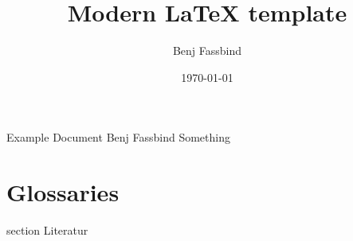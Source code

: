 \documentclass[oneside]{modern}
\title{Modern LaTeX template}
\author{Benj Fassbind}
\date{\today}
\begin{document}
  \nocite{*}

  \firstpage
    {Example Document}
    {Benj Fassbind}
    {Something}

  \addtableofcontents

  \newpage


  

  
  

  \chapter{Glossaries}

  \addglossary

  \newpage
    {section}
    {Literatur}

  \printbibliography[
    heading=subbibliography
  ]

  \newpage
  \listoffigures
\end{document}
